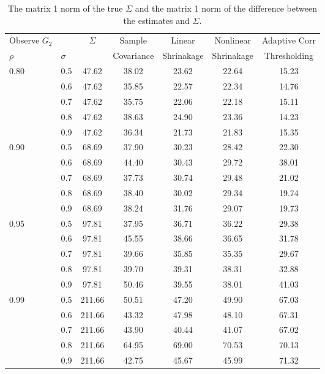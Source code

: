         \begin{table}
            
            \caption{The matrix 1 norm of the true \(\Sigma\) and the matrix 1 norm of the difference between the estimates and \(\Sigma\).}                
            \begin{tabular}{ll|ccccc}
                \toprule
                Observe \(G_{2}\) && \(\Sigma\) &Sample  &Linear  &Nonlinear &Adaptive Corr \\
                \(\rho\) &\(\sigma\) &&Covariance&Shrinakage&Shrinakage&Thresholding\\
                \midrule
                0.80 &0.5 &47.62 &38.02 &23.62 &22.64 &15.23 \\
                     &0.6 &47.62 &35.85 &22.57 &22.34 &14.76 \\
                     &0.7 &47.62 &35.75 &22.06 &22.18 &15.11 \\
                     &0.8 &47.62 &38.63 &24.90 &23.36 &14.23 \\
                     &0.9 &47.62 &36.34 &21.73 &21.83 &15.35 \\
                0.90 &0.5 &68.69 &37.90 &30.23 &28.42 &22.30 \\
                     &0.6 &68.69 &44.40 &30.43 &29.72 &38.01 \\
                     &0.7 &68.69 &37.73 &30.74 &29.48 &21.02 \\
                     &0.8 &68.69 &38.40 &30.02 &29.34 &19.74 \\
                     &0.9 &68.69 &38.24 &31.76 &29.07 &19.73 \\
                0.95 &0.5 &97.81 &37.95 &36.71 &36.22 &29.38 \\
                     &0.6 &97.81 &45.55 &38.66 &36.65 &31.78 \\
                     &0.7 &97.81 &39.66 &35.85 &35.35 &29.67 \\
                     &0.8 &97.81 &39.70 &39.31 &38.31 &32.88 \\
                     &0.9 &97.81 &50.46 &39.55 &38.01 &41.03 \\
                0.99 &0.5 &211.66 &50.51 &47.20 &49.90 &67.03 \\
                     &0.6 &211.66 &43.32 &47.98 &48.10 &67.31 \\
                     &0.7 &211.66 &43.90 &40.44 &41.07 &67.02 \\
                     &0.8 &211.66 &64.95 &69.00 &70.53 &70.13 \\
                     &0.9 &211.66 &42.75 &45.67 &45.99 &71.32 \\
                \bottomrule
                \end{tabular}
                 
        \end{table}

